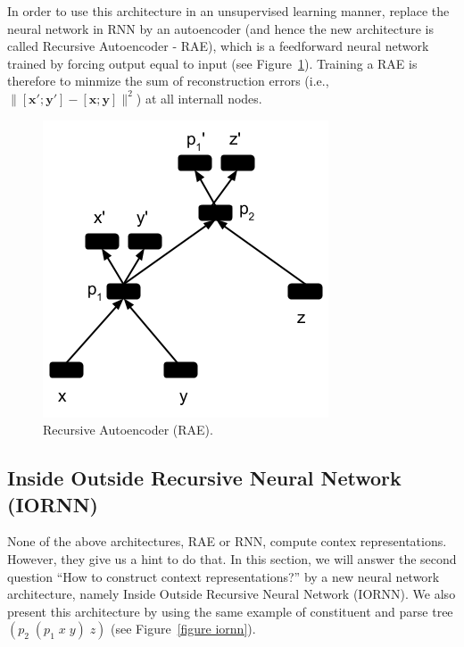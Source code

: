 \documentclass[11pt]{article}
\begin{document}
In order to use this architecture in an unsupervised learning manner, 
 replace the neural network in RNN by an autoencoder 
(and hence the new architecture is called Recursive Autoencoder - RAE), 
which is a feedforward neural network trained by forcing output equal to 
input (see Figure~\ref{figure rae}). Training a RAE is therefore to minmize 
the sum of reconstruction errors 
(i.e., $\|[\mathbf{x}';\mathbf{y}'] - [\mathbf{x};\mathbf{y}]\|^2$) at all internall nodes. 

\begin{figure}[h!]
	\center
	\includegraphics[scale=0.5]{RAE.png}
	\caption{Recursive Autoencoder (RAE).}
	\label{figure rae}
\end{figure}


\subsection{Inside Outside Recursive Neural Network (IORNN)}
\label{subsection nlm}

None of the above architectures, RAE or RNN, compute contex representations. 
However, they give us a hint to do that. In this section, we will answer the second 
question ``How to construct context representations?'' by a new neural network 
architecture, namely Inside Outside Recursive Neural Network (IORNN). We also 
present this architecture by using the same example of constituent and parse tree 
$(p_2 \; (p_1 \; x \; y) \; z)$ (see Figure~\ref{figure iornn}).
\end{document}
